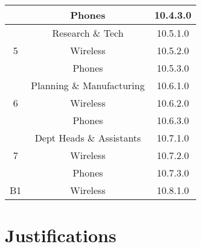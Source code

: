 \begin{table}[H]
\begin{tabular}{|c|cc|}
                       & Phones                       & 10.4.3.0 \\ \hline
    \multirow{3}{*}{5} & Research \& Tech             & 10.5.1.0 \\ \cline{2-3} 
                       & Wireless                     & 10.5.2.0 \\ \cline{2-3} 
                       & Phones                       & 10.5.3.0 \\ \hline
    \multirow{3}{*}{6} & Planning \& Manufacturing    & 10.6.1.0 \\ \cline{2-3} 
                       & Wireless                     & 10.6.2.0 \\ \cline{2-3} 
                       & Phones                       & 10.6.3.0 \\ \hline
    \multirow{3}{*}{7} & Dept Heads \& Assistants     & 10.7.1.0 \\ \cline{2-3} 
                       & Wireless                     & 10.7.2.0 \\ \cline{2-3} 
                       & Phones                       & 10.7.3.0 \\ \hline
    B1                 & Wireless                     & 10.8.1.0 \\ \hline
    \end{tabular}
\end{table}

\section{Justifications}
